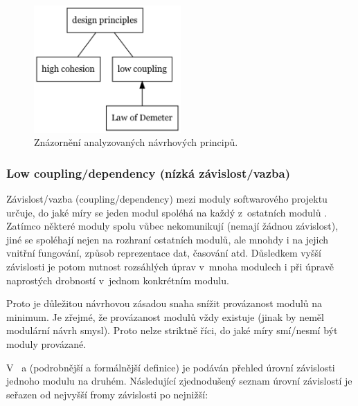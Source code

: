 \begin{figure}[h!]
  \centering
  \includegraphics[width=0.5\textwidth]{./graphs/oop_design_principles.png}
  \caption{Znázornění analyzovaných návrhových principů.\label{analyzed_principles}}
\end{figure}

\subsubsection{Low coupling/dependency (nízká závislost/vazba)}


Závislost/vazba (coupling/dependency) mezi moduly softwarového projektu určuje, do jaké míry se jeden modul spoléhá na každý z~ostatních modulů \cite{wiki:coupling}. Zatímco některé moduly spolu vůbec nekomunikují (nemají žádnou závislost), jiné se spoléhají nejen na rozhraní ostatních modulů, ale mnohdy i na jejich vnitřní fungování, způsob reprezentace dat, časování atd. Důsledkem vyšší závislosti je potom nutnost rozsáhlých úprav v~mnoha modulech i při úpravě naprostých drobností v~jednom konkrétním modulu.

Proto je důležitou návrhovou zásadou snaha snížit provázanost modulů na minimum. Je zřejmé, že provázanost modulů vždy existuje (jinak by neměl modulární návrh smysl). Proto nelze striktně říci, do jaké míry smí/nesmí být moduly provázané.

V~\cite{wiki:coupling} a \cite{STVR:STVR162} (podrobnější a formálnější definice) je podáván přehled úrovní závislosti jednoho modulu na druhém. Následující zjednodušený seznam úrovní závislostí je seřazen od nejvyšší fromy závislosti po nejnižší:

